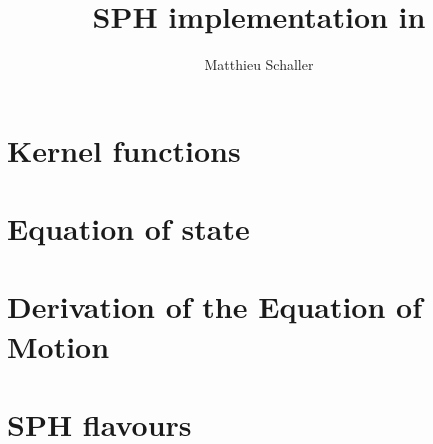 \documentclass[fleqn, usenatbib, useAMS]{mnras}
\title{SPH implementation in \swift}
\author{Matthieu Schaller}
\begin{document}
\maketitle
\section{Kernel functions}


\section{Equation of state}


\section{Derivation of the Equation of Motion}


\section{SPH flavours}




\end{document}
